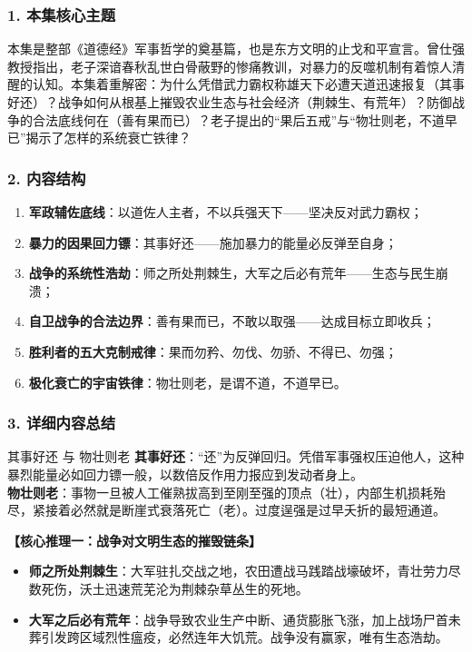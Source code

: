 \subsubsection{1. 本集核心主题}
本集是整部《道德经》军事哲学的奠基篇，也是东方文明的止戈和平宣言。曾仕强教授指出，老子深谙春秋乱世白骨蔽野的惨痛教训，对暴力的反噬机制有着惊人清醒的认知。本集着重解密：为什么凭借武力霸权称雄天下必遭天道迅速报复（其事好还）？战争如何从根基上摧毁农业生态与社会经济（荆棘生、有荒年）？防御战争的合法底线何在（善有果而已）？老子提出的“果后五戒”与“物壮则老，不道早已”揭示了怎样的系统衰亡铁律？

\subsubsection{2. 内容结构}
\begin{enumerate}
    \item \textbf{军政辅佐底线}：以道佐人主者，不以兵强天下——坚决反对武力霸权；
    \item \textbf{暴力的因果回力镖}：其事好还——施加暴力的能量必反弹至自身；
    \item \textbf{战争的系统性浩劫}：师之所处荆棘生，大军之后必有荒年——生态与民生崩溃；
    \item \textbf{自卫战争的合法边界}：善有果而已，不敢以取强——达成目标立即收兵；
    \item \textbf{胜利者的五大克制戒律}：果而勿矜、勿伐、勿骄、不得已、勿强；
    \item \textbf{极化衰亡的宇宙铁律}：物壮则老，是谓不道，不道早已。
\end{enumerate}

\subsubsection{3. 详细内容总结}

\begin{ConceptBox}{其事好还 与 物壮则老}
\textbf{其事好还}：“还”为反弹回归。凭借军事强权压迫他人，这种暴烈能量必如回力镖一般，以数倍反作用力报应到发动者身上。\\
\textbf{物壮则老}：事物一旦被人工催熟拔高到至刚至强的顶点（壮），内部生机损耗殆尽，紧接着必然就是断崖式衰落死亡（老）。过度逞强是过早夭折的最短通道。
\end{ConceptBox}

\noindent\textbf{【核心推理一：战争对文明生态的摧毁链条】}
\begin{itemize}
    \item \textbf{师之所处荆棘生}：大军驻扎交战之地，农田遭战马践踏战壕破坏，青壮劳力尽数死伤，沃土迅速荒芜沦为荆棘杂草丛生的死地。
    \item \textbf{大军之后必有荒年}：战争导致农业生产中断、通货膨胀飞涨，加上战场尸首未葬引发跨区域烈性瘟疫，必然连年大饥荒。战争没有赢家，唯有生态浩劫。
\end{itemize}

